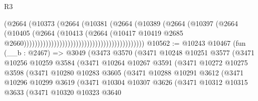 \begin{lexlean}{R3}
\begin{coremodule}
                                                                (@2664
                                                                  (@10373
                                                                    (@2664
                                                                      (@10381
                                                                        (@2664
                                                                          (@10389
                                                                            (@2664
                                                                              (@10397
                                                                                (@2664
                                                                                  (@10405
                                                                                    (@2664
                                                                                      (@10413
                                                                                        (@2664
                                                                                          (@10417
                                                                                            @10419
                                                                                            @2685
                                                                                            @2660))))))))))))))))))))))))))))))))))))))))))))
@10562 := @10243
    @10467
    (fun (__b : @2467) =>
    @3049
      (@3473
        @3570
        (@3471
          @10248
          @10251
          @3577
          (@3471
            @10256
            @10259
            @3584
            (@3471
              @10264
              @10267
              @3591
              (@3471
                @10272
                @10275
                @3598
                (@3471
                  @10280
                  @10283
                  @3605
                  (@3471
                    @10288
                    @10291
                    @3612
                    (@3471
                      @10296
                      @10299
                      @3619
                      (@3471
                        @10304
                        @10307
                        @3626
                        (@3471
                          @10312
                          @10315
                          @3633
                          (@3471
                            @10320
                            @10323
                            @3640

\end{coremodule}
\end{lexlean}
